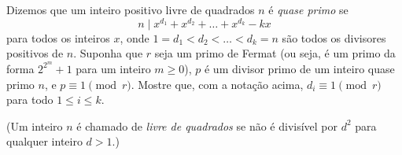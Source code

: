 Dizemos que um inteiro positivo livre de quadrados \(n\) é \emph{quase primo} se
\[
n \mid x^{d_1} + x^{d_2} + \ldots + x^{d_k} - kx
\]
para todos os inteiros \(x\), onde \(1 = d_1 < d_2 < \ldots < d_k = n\) são todos os divisores positivos de \(n\). Suponha que \(r\) seja um primo de Fermat (ou seja, é um primo da forma \(2^{2^m} + 1\) para um inteiro \(m \ge 0\)), \(p\) é um divisor primo de um inteiro quase primo \(n\), e \(p \equiv 1 \pmod{r}\). Mostre que, com a notação acima, \(d_i \equiv 1 \pmod{r}\) para todo \(1 \le i \le k\).

(Um inteiro \(n\) é chamado de \emph{livre de quadrados} se não é divisível por \(d^2\) para qualquer inteiro \(d > 1\).)

